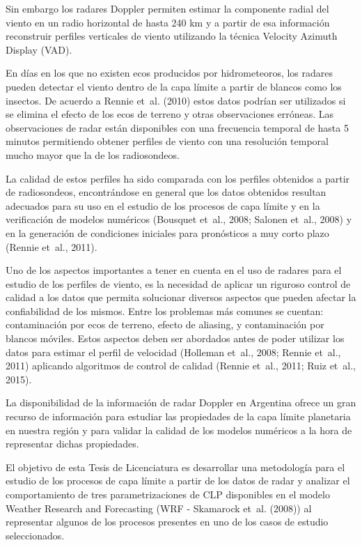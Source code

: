 \documentclass[12pt,spanish,oneside]{book}
\begin{document}
Sin embargo los radares Doppler permiten estimar la componente radial
del viento en un radio horizontal de hasta 240 km y a partir de esa
información reconstruir perfiles verticales de viento utilizando la
técnica Velocity Azimuth Display (VAD).

En días en los que no existen ecos producidos por hidrometeoros, los
radares pueden detectar el viento dentro de la capa límite a partir de
blancos como los insectos. De acuerdo a Rennie et~al. (2010) estos datos
podrían ser utilizados si se elimina el efecto de los ecos de terreno y
otras observaciones erróneas. Las observaciones de radar están
disponibles con una frecuencia temporal de hasta 5 minutos permitiendo
obtener perfiles de viento con una resolución temporal mucho mayor que
la de los radiosondeos.

La calidad de estos perfiles ha sido comparada con los perfiles
obtenidos a partir de radiosondeos, encontrándose en general que los
datos obtenidos resultan adecuados para su uso en el estudio de los
procesos de capa límite y en la verificación de modelos numéricos
(Bousquet et~al., 2008; Salonen et~al., 2008) y en la generación de
condiciones iniciales para pronósticos a muy corto plazo (Rennie et~al.,
2011).

Uno de los aspectos importantes a tener en cuenta en el uso de radares
para el estudio de los perfiles de viento, es la necesidad de aplicar un
riguroso control de calidad a los datos que permita solucionar diversos
aspectos que pueden afectar la confiabilidad de los mismos. Entre los
problemas más comunes se cuentan: contaminación por ecos de terreno,
efecto de aliasing, y contaminación por blancos móviles. Estos aspectos
deben ser abordados antes de poder utilizar los datos para estimar el
perfil de velocidad (Holleman et~al., 2008; Rennie et~al., 2011)
aplicando algoritmos de control de calidad (Rennie et~al., 2011; Ruiz
et~al., 2015).

La disponibilidad de la información de radar Doppler en Argentina ofrece
un gran recurso de información para estudiar las propiedades de la capa
límite planetaria en nuestra región y para validar la calidad de los
modelos numéricos a la hora de representar dichas propiedades.

El objetivo de esta Tesis de Licenciatura es desarrollar una metodología
para el estudio de los procesos de capa límite a partir de los datos de
radar y analizar el comportamiento de tres parametrizaciones de CLP
disponibles en el modelo Weather Research and Forecasting (WRF -
Skamarock et~al. (2008)) al representar algunos de los procesos
presentes en uno de los casos de estudio seleccionados.
\end{document}
